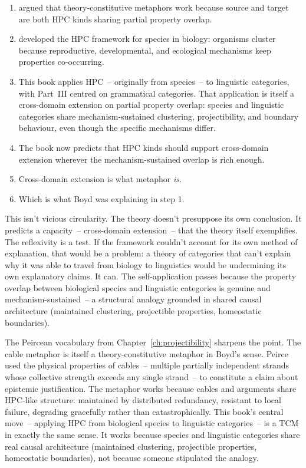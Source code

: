 \begin{enumerate}
\item \textcite{boyd1979} argued that theory-constitutive metaphors work because source and target are both HPC kinds sharing partial property overlap.
\item \textcite{boyd1991} developed the HPC framework for species in biology: organisms cluster because reproductive, developmental, and ecological mechanisms keep properties co-occurring.
\item This book applies HPC~-- originally from species~-- to linguistic categories, with Part~III centred on grammatical categories. That application is itself a cross-domain extension on partial property overlap: species and linguistic categories share mechanism-sustained clustering, projectibility, and boundary behaviour, even though the specific mechanisms differ.
\item The book now predicts that HPC kinds should support cross-domain extension wherever the mechanism-sustained overlap is rich enough.
\item Cross-domain extension is what metaphor \emph{is}.
\item Which is what Boyd was explaining in step 1.
\end{enumerate}

This isn't vicious circularity. The theory doesn't presuppose its own conclusion. It predicts a capacity~-- cross-domain extension~-- that the theory itself exemplifies. The reflexivity is a test. If the framework couldn't account for its own method of explanation, that would be a problem: a theory of categories that can't explain why it was able to travel from biology to linguistics would be undermining its own explanatory claims. It can. The self-application passes because the property overlap between biological species and linguistic categories is genuine and mechanism-sustained~-- a structural analogy grounded in shared causal architecture (maintained clustering, projectible properties, homeostatic boundaries).

The Peircean vocabulary from Chapter~\ref{ch:projectibility} sharpens the point. The cable metaphor \citep[CP~5.265]{peirce1931cp} is itself a theory-constitutive metaphor in Boyd's sense. Peirce used the physical properties of cables~-- multiple partially independent strands whose collective strength exceeds any single strand~-- to constitute a claim about epistemic justification. The metaphor works because cables and arguments share HPC-like structure: maintained by distributed redundancy, resistant to local failure, degrading gracefully rather than catastrophically. This book's central move~-- applying HPC from biological species to linguistic categories~-- is a TCM in exactly the same sense. It works because species and linguistic categories share real causal architecture (maintained clustering, projectible properties, homeostatic boundaries), not because someone stipulated the analogy.

